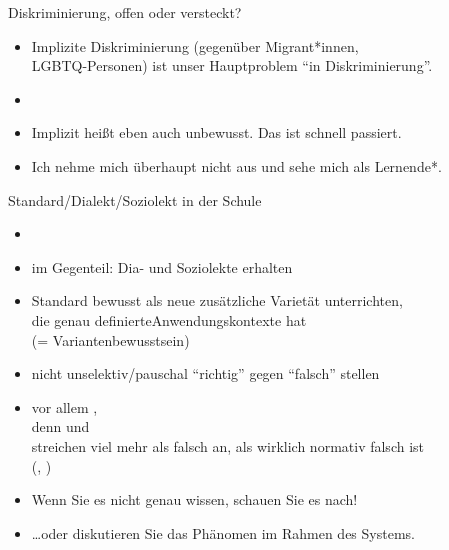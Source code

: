 \begin{frame}
  {Diskriminierung, offen oder versteckt?}
  \pause
  \begin{itemize}[<+->]
    \item Implizite Diskriminierung (\zB gegenüber Migrant*innen,\\
      LGBTQ-Personen) ist unser Hauptproblem "`in Diskriminierung"'.
    \item {}
      \Halbzeile
    \item Implizit heißt eben auch \alert{unbewusst}. Das ist schnell passiert.
      \Halbzeile
    \item Ich nehme mich überhaupt nicht aus und sehe mich als Lernende*.
    \Halbzeile
  \end{itemize}
\end{frame}

\begin{frame}
  {Standard\slash Dialekt\slash Soziolekt in der Schule}
  \pause
  \begin{itemize}[<+->]
    \item {}
    \item im Gegenteil: \alert{Dia- und Soziolekte erhalten}
    \item Standard \alert{bewusst als neue zusätzliche Varietät} unterrichten,\\
      die genau definierte\alert{Anwendungskontexte} hat\\
      (= Variantenbewusstsein)
      \Halbzeile
    \item nicht unselektiv\slash pauschal "`richtig"' gegen "`falsch"' stellen
    \item vor allem ,\\
      denn  und\\
      streichen viel mehr als falsch an, als wirklich normativ falsch ist\\
      (\citealt[4--7]{Eisenberg2004}, \citealt[319--324]{Haecker2009})
      \Halbzeile
    \item \alert{Wenn Sie es nicht genau wissen, schauen Sie es nach!}
    \item \ldots oder diskutieren Sie das Phänomen im Rahmen des Systems.
  \end{itemize}
\end{frame}


